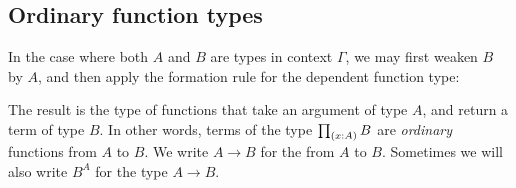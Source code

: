 \subsection{Ordinary function types}
In the case where both $A$ and $B$ are types in context $\Gamma$, we may first weaken $B$ by $A$, and then apply the formation rule for the dependent function type:
\begin{prooftree}
\end{prooftree}
The result is the type of functions that take an argument of type $A$, and return a term of type $B$. In other words, terms of the type $\prd{x:A}B$ are \emph{ordinary} functions from $A$ to $B$. We write $A\to B$ for the  from $A$ to $B$. Sometimes we will also write $B^A$ for the type $A\to B$.

